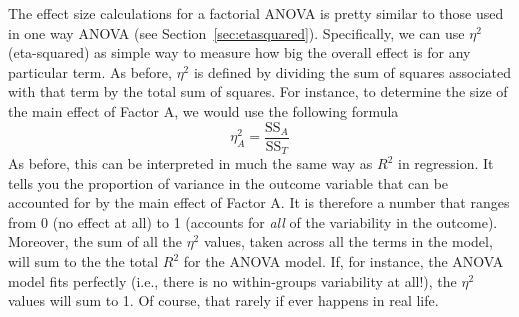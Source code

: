 The effect size calculations for a factorial ANOVA is pretty similar to those used in one way ANOVA (see Section~\ref{sec:etasquared}). Specifically, we can use $\eta^2$ (eta-squared) as simple way to measure how big the overall effect is for any particular term. As before, $\eta^2$ is defined by dividing the sum of squares associated with that term by the total sum of squares. For instance, to determine the size of the main effect of Factor A, we would use the following formula
$$
\eta_A^2 = \frac{\mbox{SS}_{A}}{\mbox{SS}_{T}}
$$
As before, this can be interpreted in much the same way as $R^2$ in regression.  It tells you the proportion of variance in the outcome variable that can be accounted for by the main effect of Factor A. It is therefore a number that ranges from 0 (no effect at all) to 1 (accounts for {\it all} of the variability in the outcome). Moreover, the sum of all the $\eta^2$ values, taken across all the terms in the model, will sum to the the total $R^2$ for the ANOVA model. If, for instance, the ANOVA model fits perfectly (i.e., there is no within-groups variability at all!), the $\eta^2$ values will sum to 1. Of course, that rarely if ever happens in real life.

